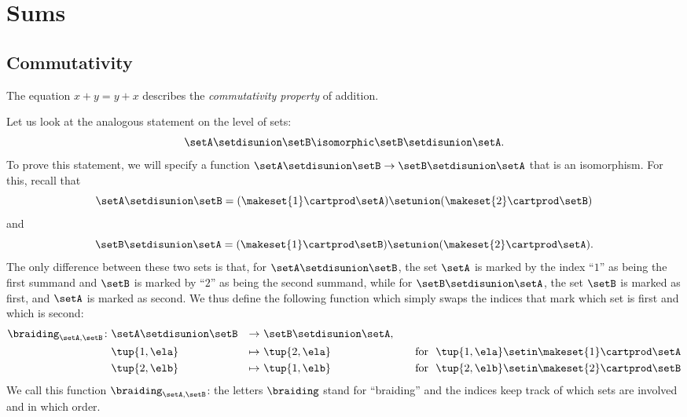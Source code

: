 



\section{Sums}
\label{sec:arithmetic-sums}


\subsection{Commutativity}


The equation $ x + y = y + x$  describes the \emph{commutativity property} of addition.


Let us look at the analogous statement on the level of sets:
\begin{equation}
\setA \setdisunion \setB \isomorphic \setB \setdisunion \setA.
\end{equation}
To prove this statement, we will specify a function $\setA \setdisunion \setB \to \setB \setdisunion \setA$ that is an isomorphism. For this, recall that 
\begin{equation}
\setA \setdisunion \setB = (\makeset{1} \cartprod \setA) \setunion (\makeset{2} \cartprod \setB)
\end{equation}
and
\begin{equation}
\setB \setdisunion \setA = (\makeset{1} \cartprod \setB) \setunion (\makeset{2} \cartprod \setA).
\end{equation}
The only difference between these two sets is that, for $\setA \setdisunion \setB$, the set $\setA$ is marked by the index ``$1$'' as being the first summand and $\setB$ is marked by ``$2$'' as being the second summand, while for $\setB \setdisunion \setA$, the set $\setB$ is marked as first, and $\setA$ is marked as second. We thus define the following function which simply swaps the indices that mark which set is first and which is second: 
\begin{equation}\label{eq:braiding-sum-sets}
\begin{aligned}
        \braiding_{\setA, \setB} \colon & \setA \setdisunion \setB & \to & \ \setB \setdisunion \setA, & \ \\
        & \tup{1, \ela} & \mapsto &\  \tup{2, \ela} & \ \text{ for } \ \tup{1, \ela} \setin \makeset{1} \cartprod \setA
         \\
        & \tup{2, \elb} & \mapsto &\  \tup{1, \elb} & \ \ \text{ for } \ \tup{2, \elb} \setin \makeset{2} \cartprod \setB \\
\end{aligned}
\end{equation}
We call this function $\braiding_{\setA, \setB}$: the letters $\braiding$ stand for ``braiding'' and the indices keep track of which sets are involved and in which order.

